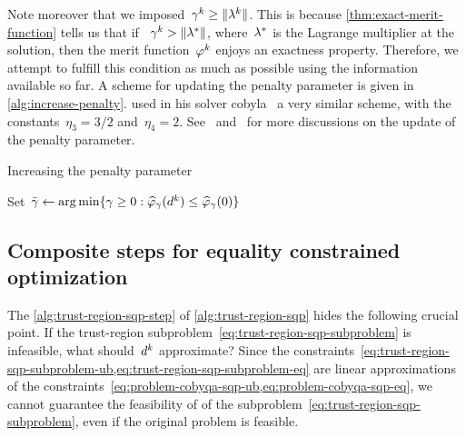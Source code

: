 Note moreover that we imposed~$\gamma^k \ge \norm{\lm[k]}$.
This is because \cref{thm:exact-merit-function} tells us that if ~$\gamma^k > \norm{\lm[\ast]}$, where~$\lm[\ast]$ is the Lagrange multiplier at the solution, then the merit function~$\merit[k]$ enjoys an exactness property.
Therefore, we attempt to fulfill this condition as much as possible using the information available so far.
A scheme for updating the penalty parameter is given in \cref{alg:increase-penalty}.
\citeauthor{Powell_1994} used in his solver \gls{cobyla}~\cite{Powell_1994} a very similar scheme, with the constants~$\eta_3 = 3/2$ and~$\eta_4 = 2$.
See~\cite[pp.~661--662]{Conn_Gould_Toint_2000} and~\cite[p.~542]{Nocedal_Wright_2006} for more discussions on the update of the penalty parameter.

\begin{algorithm}
    \caption{Increasing the penalty parameter}
    \label{alg:increase-penalty}
    \DontPrintSemicolon
    \onehalfspacing
    Set~$\bar{\gamma} \gets \argmin \set{\gamma \ge 0 : \meritm_{\gamma}(\step[k]) \le \meritm_{\gamma}(0)}$\;
\end{algorithm}

\subsection{Composite steps for equality constrained optimization}
\label{subsec:composite-step-equality}

The \cref{alg:trust-region-sqp-step} of \cref{alg:trust-region-sqp} hides the following crucial point.
If the trust-region subproblem~\cref{eq:trust-region-sqp-subproblem} is infeasible, what should~$\step[k]$ approximate?
Since the constraints~\cref{eq:trust-region-sqp-subproblem-ub,eq:trust-region-sqp-subproblem-eq} are linear approximations of the constraints~\cref{eq:problem-cobyqa-sqp-ub,eq:problem-cobyqa-sqp-eq}, we cannot guarantee the feasibility of of the subproblem~\cref{eq:trust-region-sqp-subproblem}, even if the original problem is feasible.

